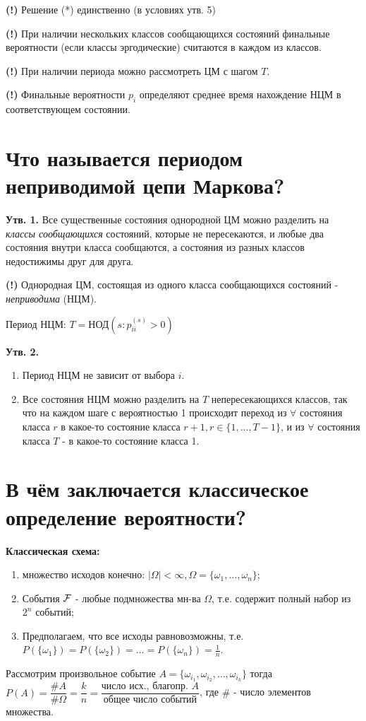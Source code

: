 \textbf{(!)} Решение (*) единственно (в условиях утв. 5)

\textbf{(!)} При наличии нескольких классов сообщающихся состояний финальные вероятности (если классы эргодические) считаются в каждом из классов.

\textbf{(!)} При наличии периода можно рассмотреть ЦМ с шагом $T$.

\textbf{(!)} Финальные вероятности $p_i$ определяют среднее время нахождение НЦМ в соответствующем состоянии.

\section{Что называется периодом неприводимой цепи Маркова?}

\textbf{Утв. 1.} Все существенные состояния однородной ЦМ можно разделить на \textit{классы сообщающихся} состояний, которые не пересекаются, и любые два состояния внутри класса сообщаются, а состояния из разных классов недостижимы друг для друга.

\noindent\textbf{(!)} Однородная ЦМ, состоящая из одного класса сообщающихся состояний - \textit{неприводима} (НЦМ).

Период НЦМ: $T = \text{НОД}(s: p_{ii}^{(s)} > 0)$

\textbf{Утв. 2.}
\begin{enumerate}
	\item Период НЦМ не зависит от выбора $i$.
	\item Все состояния НЦМ можно разделить на $T$ непересекающихся классов, так что на каждом шаге с вероятностью 1 происходит переход из $\forall$ состояния класса $r$ в какое-то состояние класса $r+1, r \in \{1, \dots, T-1\}$, и из $\forall$ состояния класса $T$ - в какое-то состояние класса 1.
\end{enumerate}

\section{В чём заключается классическое определение вероятности?}

\textbf{Классическая схема:}
\begin{enumerate}
	\item множество исходов конечно: $|\Omega| < \infty, \Omega = \{\omega_1,\dots,\omega_n\}$;
	\item События ${\mathcal F}$ - любые подмножества мн-ва $\Omega$, т.е. содержит полный набор из $2^n$ событий;
	\item Предполагаем, что все исходы равновозможны, т.е. $P(\{\omega_1\}) = P(\{\omega_2\}) = \dots = P(\{\omega_n\}) = \frac{1}{n}$.
\end{enumerate}
Рассмотрим произвольное событие $A = \{\omega_{i_1},\omega_{i_2}, \dots, \omega_{i_k}\}$ тогда
$P(A) = \dfrac{\#A}{\#\Omega}=\dfrac{k}{n}=\dfrac{\text{число исх., благопр. } A}{\text{общее число событий}}$, где $\#$ - число элементов множества.

